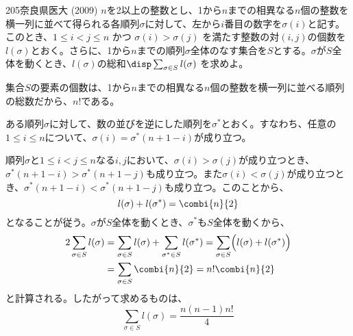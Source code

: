 \begin{thm}{205}{}{奈良県医大 (2009)}
 $n$を2以上の整数とし、1から$n$までの相異なる$n$個の整数を横一列に並べて得られる各順列$\sigma$に対して、左から$i$番目の数字を$\sigma(i)$と記す。このとき、$1\le i < j \le n$ かつ $\sigma(i)>\sigma(j)$ を満たす整数の対$(i,j)$の個数を$l(\sigma)$とおく。さらに、1から$n$までの順列$\sigma$全体のなす集合を$S$とする。$\sigma$が$S$全体を動くとき、$l(\sigma)$の総和$\disp \sum_{\sigma\in S} l(\sigma)$ を求めよ。
\end{thm}

集合$S$の要素の個数は、1から$n$までの相異なる$n$個の整数を横一列に並べる順列の総数だから、$n!$である。

ある順列$\sigma$に対して、数の並びを逆にした順列を$\sigma^*$とおく。すなわち、任意の$1\le i\le n$について、$\sigma(i)=\sigma^*(n+1-i)$が成り立つ。

順列$\sigma$と$1\le i < j \le n$なる$i,j$において、$\sigma(i)>\sigma(j)$が成り立つとき、$\sigma^*(n+1-i)>\sigma^*(n+1-j)$も成り立つ。また$\sigma(i)<\sigma(j)$が成り立つとき、$\sigma^*(n+1-i)<\sigma^*(n+1-j)$も成り立つ。このことから、
\[ l(\sigma)+l(\sigma^*)=\combi{n}{2} \]
となることが従う。$\sigma$が$S$全体を動くとき、$\sigma^*$も$S$全体を動くから、
\begin{align*}
 2\sum_{\sigma\in S} l(\sigma) &= \sum_{\sigma\in S} l(\sigma) + \sum_{\sigma^*\in S} l(\sigma^*)=\sum_{\sigma\in S} \Bigl(l(\sigma)+l(\sigma^*)\Bigr) \\
 &=\sum_{\sigma\in S} \combi{n}{2}=n!\combi{n}{2}
\end{align*}
と計算される。したがって求めるものは、
\[ \sum_{\sigma\in S} l(\sigma) = \frac{n(n-1)n!}{4} \]